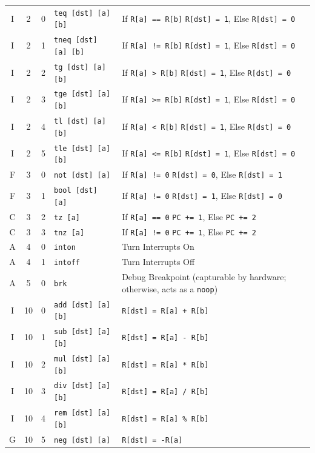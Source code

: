 \documentclass{article}
\begin{document}
\begin{table}[h!]
\begin{footnotesize}
\begin{tabular}{c|cc|l|l}
			I & 2 & 0 & \texttt{teq [dst] [a] [b]} & If \texttt{R[a] == R[b]} \texttt{R[dst] = 1}, Else \texttt{R[dst] = 0} \\
			I & 2 & 1 & \texttt{tneq [dst] [a] [b]} & If \texttt{R[a] != R[b]} \texttt{R[dst] = 1}, Else \texttt{R[dst] = 0} \\
			I & 2 & 2 & \texttt{tg [dst] [a] [b]} & If \texttt{R[a] > R[b]} \texttt{R[dst] = 1}, Else \texttt{R[dst] = 0} \\
			I & 2 & 3 & \texttt{tge [dst] [a] [b]} & If \texttt{R[a] >= R[b]} \texttt{R[dst] = 1}, Else \texttt{R[dst] = 0} \\
			I & 2 & 4 & \texttt{tl [dst] [a] [b]} & If \texttt{R[a] < R[b]} \texttt{R[dst] = 1}, Else \texttt{R[dst] = 0} \\
			I & 2 & 5 & \texttt{tle [dst] [a] [b]} & If \texttt{R[a] <= R[b]} \texttt{R[dst] = 1}, Else \texttt{R[dst] = 0} \\

			F & 3 & 0 & \texttt{not [dst] [a]} & If \texttt{R[a] != 0} \texttt{R[dst] = 0}, Else \texttt{R[dst] = 1} \\
			F & 3 & 1 & \texttt{bool [dst] [a]} & If \texttt{R[a] != 0} \texttt{R[dst] = 1}, Else \texttt{R[dst] = 0} \\
			C & 3 & 2 & \texttt{tz [a]} & If \texttt{R[a] == 0} \texttt{PC += 1}, Else \texttt{PC += 2} \\
			C & 3 & 3 & \texttt{tnz [a]} & If \texttt{R[a] != 0} \texttt{PC += 1}, Else \texttt{PC += 2} \\

			A & 4 & 0 & \texttt{inton} & Turn Interrupts On \\
			A & 4 & 1 & \texttt{intoff} & Turn Interrupts Off \\

            A & 5 & 0 & \texttt{brk} & Debug Breakpoint (capturable by hardware; otherwise, acts as a \texttt{noop}) \\

			I & 10 & 0 & \texttt{add [dst] [a] [b]} & \texttt{R[dst] = R[a] + R[b]} \\
			I & 10 & 1 & \texttt{sub [dst] [a] [b]} & \texttt{R[dst] = R[a] - R[b]} \\
			I & 10 & 2 & \texttt{mul [dst] [a] [b]} & \texttt{R[dst] = R[a] * R[b]} \\
			I & 10 & 3 & \texttt{div [dst] [a] [b]} & \texttt{R[dst] = R[a] / R[b]} \\
			I & 10 & 4 & \texttt{rem [dst] [a] [b]} & \texttt{R[dst] = R[a] \% R[b]} \\
			G & 10 & 5 & \texttt{neg [dst] [a]} & \texttt{R[dst] = -R[a]} \\


\end{tabular}
\end{footnotesize}
\end{table}
\end{document}
